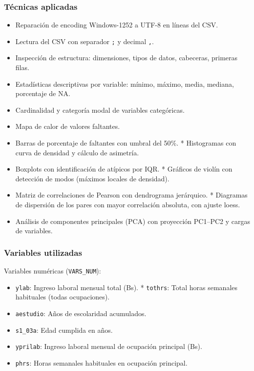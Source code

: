 \documentclass[12pt,a4paper]{article}
\begin{document}
\subsubsection{Técnicas aplicadas}
\begin{itemize}
  \item Reparación de encoding Windows-1252 a UTF-8 en líneas del CSV.
  \item Lectura del CSV con separador \texttt{;} y decimal \texttt{,}.
  \item Inspección de estructura: dimensiones, tipos de datos, cabeceras, primeras filas.
  \item Estadísticas descriptivas por variable: mínimo, máximo, media, mediana, porcentaje de NA.
  \item Cardinalidad y categoría modal de variables categóricas.
  \item Mapa de calor de valores faltantes.
  \item Barras de porcentaje de faltantes con umbral del 50\%.
  * Histogramas con curva de densidad y cálculo de asimetría.
  \item Boxplots con identificación de atípicos por IQR.
  * Gráficos de violín con detección de modos (máximos locales de densidad).
  \item Matriz de correlaciones de Pearson con dendrograma jerárquico.
  * Diagramas de dispersión de los pares con mayor correlación absoluta, con ajuste loess.
  \item Análisis de componentes principales (PCA) con proyección PC1--PC2 y cargas de variables.
\end{itemize}

\subsubsection{Variables utilizadas}
Variables numéricas (\texttt{VARS\_NUM}):
\begin{itemize}
  \item \texttt{ylab}: Ingreso laboral mensual total (Bs).
  * \texttt{tothrs}: Total horas semanales habituales (todas ocupaciones).
  \item \texttt{aestudio}: Años de escolaridad acumulados.
  \item \texttt{s1\_03a}: Edad cumplida en años.
  \item \texttt{yprilab}: Ingreso laboral mensual de ocupación principal (Bs).
  \item \texttt{phrs}: Horas semanales habituales en ocupación principal.
\end{itemize}
\end{document}
